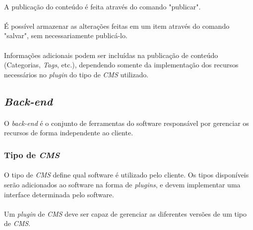 \documentclass[a4paper,12pt]{article}
\def\cms{\emph{CMS}}
\def\plugin{\emph{plugin}}
\begin{document}
\paragraph{}
A publicação do conteúdo é feita através do comando "publicar".

\paragraph{}
É possível armazenar as alterações feitas em um item através do comando
"salvar", sem necessariamente publicá-lo.

\paragraph{}
Informações adicionais podem ser incluídas na publicação de conteúdo
(Categorias, \emph{Tags}, etc.), dependendo somente da implementação
dos recursos necessários no \plugin{} do tipo de \cms{} utilizado. 

\subsection{\emph{Back-end}}

\paragraph{}
O \emph{back-end} é o conjunto de ferramentas do software responsável por
gerenciar os recursos de forma independente ao cliente.

\subsubsection{Tipo de \cms{}} \label{tipocms}

\paragraph{}
O tipo de \cms{} define qual software é utilizado pelo cliente. Os tipos
disponíveis serão adicionados ao software na forma de \emph{plugins}, e devem
implementar uma interface determinada pelo software.


\paragraph{}
Um \emph{plugin} de \cms{} deve ser capaz de gerenciar as diferentes versões de
um tipo de \cms{}.
\end{document}
